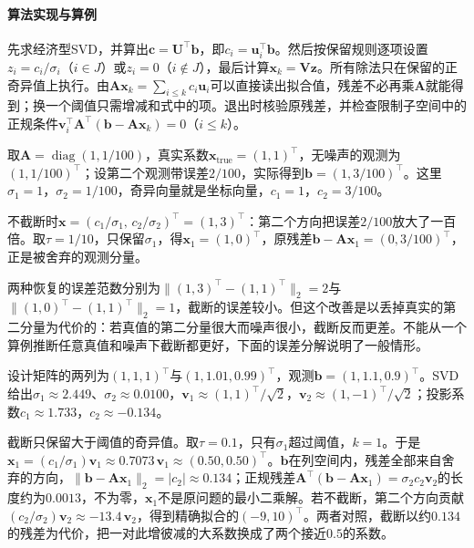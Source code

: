 \paragraph{算法实现与算例}
先求经济型SVD，并算出$\bm c=\bm U^\top\bm b$，即$c_i=\bm u_i^\top\bm b$。然后按保留规则逐项设置$z_i=c_i/\sigma_i$（$i\in J$）或$z_i=0$（$i\notin J$），最后计算$\bm x_k=\bm V\bm z$。所有除法只在保留的正奇异值上执行。由$\bm A\bm x_k=\sum_{i\leq k}c_i\bm u_i$可以直接读出拟合值，残差不必再乘$\bm A$就能得到；换一个阈值只需增减和式中的项。退出时核验原残差，并检查限制子空间中的正规条件$\bm v_i^\top\bm A^\top(\bm b-\bm A\bm x_k)=0$（$i\leq k$）。

\begin{example}[对角矩阵的谱截断]
\label{ex:ls-tsvd-diagonal}
取$\bm A=\operatorname{diag}(1,1/100)$，真实系数$\bm x_{\mathrm{true}}=(1,1)^\top$，无噪声的观测为$(1,1/100)^\top$；设第二个观测带误差$2/100$，实际得到$\bm b=(1,3/100)^\top$。这里$\sigma_1=1$，$\sigma_2=1/100$，奇异向量就是坐标向量，$c_1=1$，$c_2=3/100$。

不截断时$\bm x=(c_1/\sigma_1,\,c_2/\sigma_2)^\top=(1,3)^\top$：第二个方向把误差$2/100$放大了一百倍。取$\tau=1/10$，只保留$\sigma_1$，得$\bm x_1=(1,0)^\top$，原残差$\bm b-\bm A\bm x_1=(0,3/100)^\top$，正是被舍弃的观测分量。

两种恢复的误差范数分别为$\lVert(1,3)^\top-(1,1)^\top\rVert_2=2$与$\lVert(1,0)^\top-(1,1)^\top\rVert_2=1$，截断的误差较小。但这个改善是以丢掉真实的第二分量为代价的：若真值的第二分量很大而噪声很小，截断反而更差。不能从一个算例推断任意真值和噪声下截断都更好，下面的误差分解说明了一般情形。
\end{example}

\begin{example}[近共线设计的截断求解]
\label{ex:ls-tsvd-steps}
设计矩阵的两列为$(1,1,1)^\top$与$(1,1.01,0.99)^\top$，观测$\bm b=(1,1.1,0.9)^\top$。SVD给出$\sigma_1\approx2.449$、$\sigma_2\approx0.0100$，$\bm v_1\approx(1,1)^\top/\sqrt2$，$\bm v_2\approx(1,-1)^\top/\sqrt2$；投影系数$c_1\approx1.733$，$c_2\approx-0.134$。

截断只保留大于阈值的奇异值。取$\tau=0.1$，只有$\sigma_1$超过阈值，$k=1$。于是$\bm x_1=(c_1/\sigma_1)\bm v_1\approx0.7073\,\bm v_1\approx(0.50,0.50)^\top$。$\bm b$在列空间内，残差全部来自舍弃的方向，$\lVert\bm b-\bm A\bm x_1\rVert_2=|c_2|\approx0.134$；正规残差$\bm A^\top(\bm b-\bm A\bm x_1)=\sigma_2c_2\bm v_2$的长度约为$0.0013$，不为零，$\bm x_1$不是原问题的最小二乘解。若不截断，第二个方向贡献$(c_2/\sigma_2)\bm v_2\approx-13.4\,\bm v_2$，得到精确拟合的$(-9,10)^\top$。两者对照，截断以约$0.134$的残差为代价，把一对此增彼减的大系数换成了两个接近$0.5$的系数。
\end{example}

